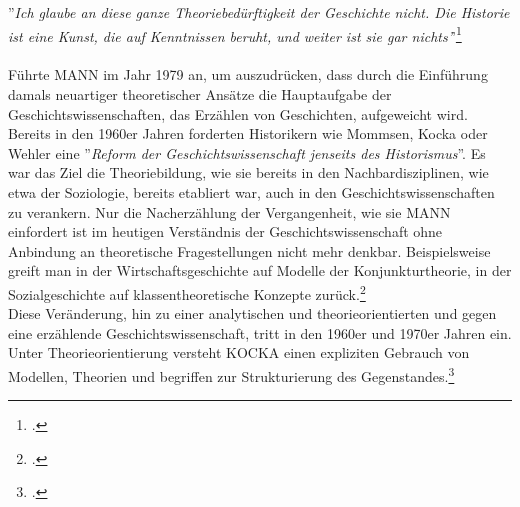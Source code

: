 \documentclass[12pt,a4paper]{article}
\begin{document}
''\textit{Ich glaube an diese ganze Theoriebedürftigkeit der Geschichte nicht. Die Historie ist eine Kunst, die auf Kenntnissen beruht, und weiter ist sie gar nichts'}'\footcite[Vgl.][S.53]{mann1979pladoyer}
\\
\\
Führte MANN im Jahr 1979 an, um auszudrücken, dass durch die Einführung damals neuartiger theoretischer Ansätze die Hauptaufgabe der Geschichtswissenschaften, das Erzählen von Geschichten, aufgeweicht wird. Bereits in den 1960er Jahren forderten Historikern wie Mommsen, Kocka oder Wehler eine ''\textit{Reform der Geschichtswissenschaft jenseits des Historismus}''. Es war das Ziel die Theoriebildung, wie sie bereits in den Nachbardisziplinen, wie etwa der Soziologie, bereits etabliert war, auch in den Geschichtswissenschaften zu verankern. Nur die Nacherzählung der Vergangenheit, wie sie MANN einfordert ist im heutigen Verständnis der Geschichtswissenschaft ohne Anbindung an theoretische Fragestellungen nicht mehr denkbar. Beispielsweise greift man in der Wirtschaftsgeschichte auf Modelle der Konjunkturtheorie, in der Sozialgeschichte  auf  klassentheoretische  Konzepte zurück.\footcite[][S.1]{sokollgrundlagen}
\\
Diese Veränderung, hin zu einer analytischen und theorieorientierten und gegen eine erzählende Geschichtswissenschaft, tritt in den 1960er und 1970er Jahren ein. Unter Theorieorientierung versteht KOCKA einen expliziten Gebrauch von Modellen, Theorien und begriffen zur Strukturierung des Gegenstandes.\footcite[][S.2]{magerski2009schreibt}

\end{document}

